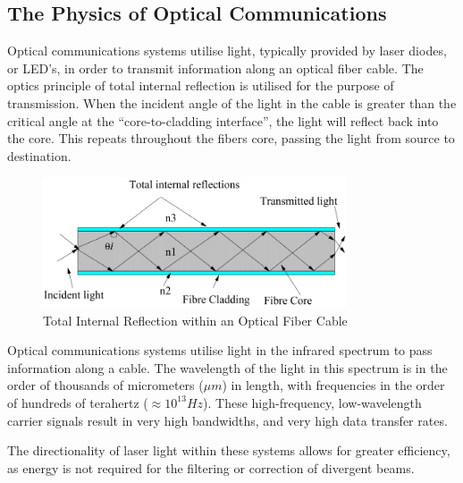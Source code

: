 \subsection{The Physics of Optical Communications}

Optical communications systems utilise light, typically provided by laser
diodes, or LED's, in order to transmit information along an optical fiber cable.
The optics principle of total internal reflection is utilised for the purpose of
transmission. When the incident angle of the light in the cable is greater than
the critical angle at the ``core-to-cladding interface''\cite{alwayn_2004}, the
light will reflect back into the core. This repeats throughout the fibers core,
passing the light from source to destination.

\begin{figure}[H]
	\centering
	\includegraphics[width=0.8\textwidth]{images/tir}
	\caption{Total Internal Reflection within an Optical Fiber
	Cable\cite{memon_2018}}
	\label{fig:tir}
\end{figure}

\par Optical communications systems utilise light in the infrared spectrum to pass
information along a cable. The wavelength of the light in this spectrum is
in the order of thousands of micrometers ($\mu m$) in length, with frequencies
in the order of hundreds of terahertz ($\approx 10^{13}Hz$). These
high-frequency, low-wavelength carrier signals result in very high bandwidths,
and very high data transfer rates\cite{mickelson_2003}.

\par The directionality of laser light within these systems allows for greater
efficiency, as energy is not required for the filtering or correction of
divergent beams\cite{mickelson_2003}.
